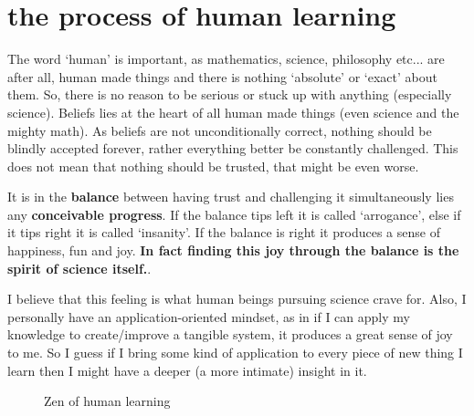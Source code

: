 \documentclass[./main.tex]{subfiles}
\begin{document}
\chapter*{the process of human learning}

The word `human' is important, as mathematics, science, philosophy etc... are after all, human made things and there is nothing `absolute' or `exact' about them.
So, there is no reason to be serious or stuck up with anything (especially science).
Beliefs lies at the heart of all human made things (even science and the mighty math).
As beliefs are not unconditionally correct, nothing should be blindly accepted forever, rather everything better be constantly challenged.
This does not mean that nothing should be trusted, that might be even worse.

It is in the \textbf{balance} between having trust and challenging it simultaneously lies any \textbf{conceivable progress}.
If the balance tips left it is called `arrogance', else if it tips right it is called `insanity'.
If the balance is right it produces a sense of happiness, fun and joy.
\textbf{In fact finding this joy through the balance is the spirit of science itself.}.

I believe that this feeling is what human beings pursuing science crave for.
Also, I personally have an application-oriented mindset, as in if I can apply my knowledge to create/improve a tangible system, it produces a great sense of joy to me.
So I guess if I bring some kind of application to every piece of new thing I learn then I might have a deeper (a more intimate) insight in it.

\begin{figure}[h]
  \centering
  \label{fig:human_learning}
  \caption{Zen of human learning}
\end{figure}
\end{document}
